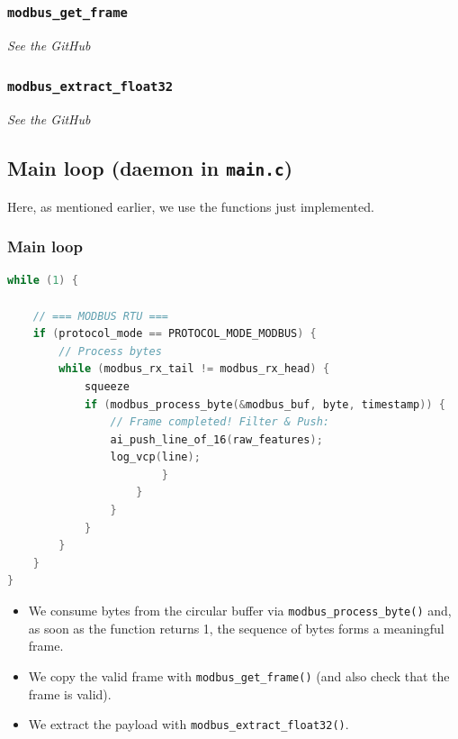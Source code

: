 \subsubsection{\texttt{modbus\_get\_frame}}

\begin{center}
    \textit{See the GitHub}
\end{center}

\subsubsection{\texttt{modbus\_extract\_float32}}

\begin{center}
    \textit{See the GitHub}
\end{center}

\subsection{Main loop (daemon in \texttt{main.c})}

Here, as mentioned earlier, we use the functions just implemented.

\subsubsection{Main loop}

\begin{lstlisting}[language=C]
while (1) {

    // === MODBUS RTU ===
    if (protocol_mode == PROTOCOL_MODE_MODBUS) {
        // Process bytes
        while (modbus_rx_tail != modbus_rx_head) {
            squeeze
            if (modbus_process_byte(&modbus_buf, byte, timestamp)) {
                // Frame completed! Filter & Push:
                ai_push_line_of_16(raw_features);
                log_vcp(line);
                        }
                    }
                }
            }
        }
    }
}
\end{lstlisting}

\begin{itemize}
    \item We consume bytes from the circular buffer via \texttt{modbus\_process\_byte()} and, as soon as the function returns 1, the sequence of bytes forms a meaningful frame.
    \item We copy the valid frame with \texttt{modbus\_get\_frame()} (and also check that the frame is valid).
    \item We extract the payload with \texttt{modbus\_extract\_float32()}.
\end{itemize}

